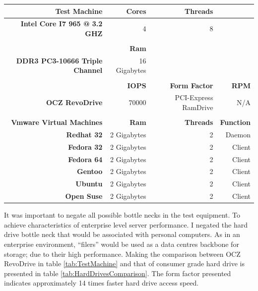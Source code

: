 		
		\begin{tablehere}	
		
			\begin{tabular}{rrrr}

				{\bf Test Machine} 						& {\bf Cores} 	& {\bf Threads} 		&            		\\ \hline
				{\bf Intel Core I7 965 @ 3.2 GHZ} 		&          4 	&          8 			&            		\\
														&            	&            			&            		\\
														&  {\bf Ram} 	&            			&            		\\ \hline
				{\bf DDR3 PC3-10666 Triple Channel } 	& 16 Gigabytes 	&            			&            		\\
														&            	&            			&            		\\
														& {\bf IOPS} 	& {\bf Form Factor} 	&  {\bf RPM} 		\\ \hline													
				{\bf OCZ RevoDrive } 					&      70000 	& PCI-Express RamDrive 	&        N/A 		\\
														&            	&            			&            		\\
				{\bf Vmware Virtual Machines} 			&  {\bf Ram} 	& {\bf Threads} 		& {\bf Function} 	\\ \hline
				{\bf Redhat 32} 						& 2 Gigabytes 	&          2 			&     Daemon 		\\
				{\bf Fedora 32} 						& 2 Gigabytes 	&          2 			&     Client 		\\
				{\bf Fedora 64} 						& 2 Gigabytes 	&          2 			&     Client		\\
				{\bf Gentoo} 							& 2 Gigabytes 	&          2 			&     Client 		\\
				{\bf Ubuntu} 							& 2 Gigabytes 	&          2 			&     Client 		\\
				{\bf Open Suse} 						& 2 Gigabytes 	&          2 			&     Client 		\\

			\end{tabular}  
			
			\caption{Test Machine}
			\label{tab:TestMachine}
			
		\end{tablehere}	
		
		\vspace{5mm}
		\normalsize
		{					
			It was important to negate all possible bottle necks in the test equipment.  To achieve characteristics of 
			enterprise level server performance. I negated the hard drive bottle neck that would be associated with personal computers.
			As in an enterprise environment, ``filers'' would be used as a data centres backbone for storage; due to their high performance.
			\newline
			\newline
			Making the comparison between OCZ RevoDrive in table \ref{tab:TestMachine} and that of consumer grade hard drive is presented
			in table \ref{tab:HardDrivesComparison}.  The form factor presented indicates approximately 14 times faster hard drive access speed.
			\newline
		}
		
